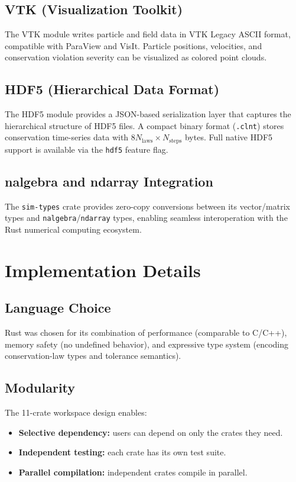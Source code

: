 \documentclass[11pt,a4paper]{article}
\begin{document}
\subsection{VTK (Visualization Toolkit)}
The VTK module writes particle and field data in VTK Legacy ASCII format, compatible with ParaView and VisIt. Particle positions, velocities, and conservation violation severity can be visualized as colored point clouds.

\subsection{HDF5 (Hierarchical Data Format)}
The HDF5 module provides a JSON-based serialization layer that captures the hierarchical structure of HDF5 files. A compact binary format (\texttt{.clnt}) stores conservation time-series data with $8N_{\text{laws}} \times N_{\text{steps}}$ bytes. Full native HDF5 support is available via the \texttt{hdf5} feature flag.

\subsection{nalgebra and ndarray Integration}
The \texttt{sim-types} crate provides zero-copy conversions between its vector/matrix types and \texttt{nalgebra}/\texttt{ndarray} types, enabling seamless interoperation with the Rust numerical computing ecosystem.

\section{Implementation Details}
\label{sec:implementation}

\subsection{Language Choice}
Rust was chosen for its combination of performance (comparable to C/C++), memory safety (no undefined behavior), and expressive type system (encoding conservation-law types and tolerance semantics).

\subsection{Modularity}
The 11-crate workspace design enables:
\begin{itemize}
    \item \textbf{Selective dependency:} users can depend on only the crates they need.
    \item \textbf{Independent testing:} each crate has its own test suite.
    \item \textbf{Parallel compilation:} independent crates compile in parallel.
\end{itemize}
\end{document}
